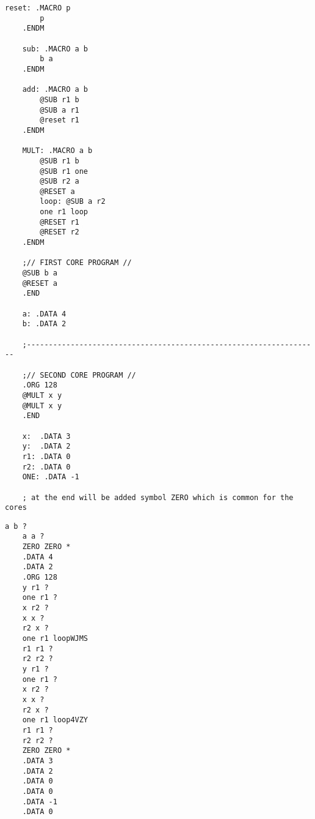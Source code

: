 \documentclass[../main.tex]{subfiles}
\begin{document}
\begin{lstlisting}[caption={Exemplu de cod în subleq assembly}, label={lst:code}]
    reset: .MACRO p
        p
    .ENDM
    
    sub: .MACRO a b
        b a
    .ENDM
    
    add: .MACRO a b
        @SUB r1 b
        @SUB a r1
        @reset r1
    .ENDM
    
    MULT: .MACRO a b
        @SUB r1 b
        @SUB r1 one
        @SUB r2 a
        @RESET a
        loop: @SUB a r2
        one r1 loop
        @RESET r1
        @RESET r2
    .ENDM
    
    ;// FIRST CORE PROGRAM //
    @SUB b a
    @RESET a
    .END
    
    a: .DATA 4
    b: .DATA 2
    
    ;-------------------------------------------------------------------
    
    ;// SECOND CORE PROGRAM //
    .ORG 128
    @MULT x y
    @MULT x y
    .END
    
    x:  .DATA 3
    y:  .DATA 2
    r1: .DATA 0
    r2: .DATA 0
    ONE: .DATA -1
    
    ; at the end will be added symbol ZERO which is common for the cores
\end{lstlisting}

\begin{lstlisting}[caption={Conținutul fișierului intermediar pentru exemplul dat}, label={lst:intermediate}]
    a b ? 
    a a ? 
    ZERO ZERO *
    .DATA 4
    .DATA 2
    .ORG 128
    y r1 ? 
    one r1 ? 
    x r2 ? 
    x x ? 
    r2 x ? 
    one r1 loopWJMS 
    r1 r1 ? 
    r2 r2 ? 
    y r1 ? 
    one r1 ? 
    x r2 ? 
    x x ? 
    r2 x ? 
    one r1 loop4VZY 
    r1 r1 ? 
    r2 r2 ? 
    ZERO ZERO *
    .DATA 3
    .DATA 2
    .DATA 0
    .DATA 0
    .DATA -1
    .DATA 0
\end{lstlisting}

\clearpage
\end{document}
